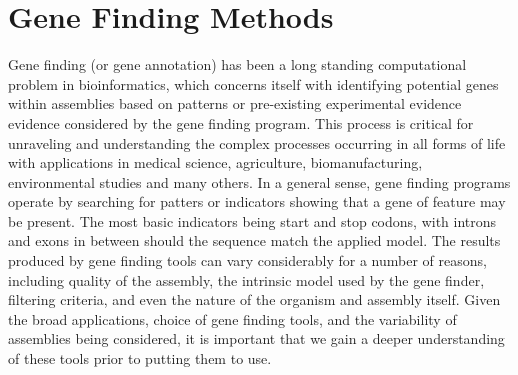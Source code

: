 \section{Gene Finding Methods}
Gene finding (or gene annotation) has been a long standing
computational problem in bioinformatics, which concerns itself with
identifying potential genes within assemblies based on patterns or
pre-existing experimental evidence evidence considered by the gene
finding program. This process is critical for unraveling and
understanding the complex processes occurring in all forms of life
with applications in medical science, agriculture, biomanufacturing,
environmental studies and many others. In a general sense, gene
finding programs operate by searching for patters or indicators
showing that a gene of feature may be present. The most basic
indicators being start and stop codons, with introns and exons in
between should the sequence match the applied model. The results
produced by gene finding tools can vary considerably for a number of
reasons, including quality of the assembly, the intrinsic model used
by the gene finder, filtering criteria, and even the nature of the
organism and assembly itself. Given the broad applications, choice of
gene finding tools, and the variability of assemblies being
considered, it is important that we gain a deeper understanding of
these tools prior to putting them to use.


